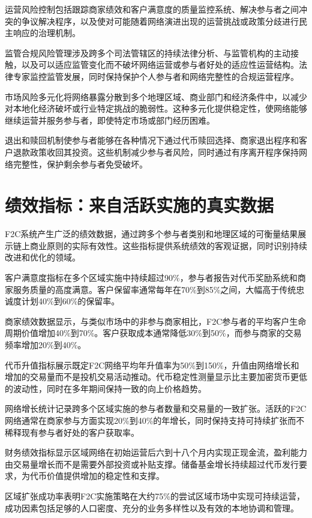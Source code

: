 \documentclass[
  Letterpaper,
]{scrbook}
\begin{document}
运营风险控制包括跟踪商家绩效和客户满意度的质量监控系统、解决参与者之间冲突的争议解决程序，以及使对可能随着网络演进出现的运营挑战或政策分歧进行民主响应的治理机制。

监管合规风险管理涉及跨多个司法管辖区的持续法律分析、与监管机构的主动接触，以及可以适应监管变化而不破坏网络运营或参与者好处的适应性运营结构。法律专家监控监管发展，同时保持保护个人参与者和网络完整性的合规运营程序。

市场风险多元化将网络暴露分散到多个地理区域、商业部门和经济条件中，以减少对本地化经济破坏或行业特定挑战的脆弱性。这种多元化提供稳定性，使网络能够继续运营并服务参与者，即使特定市场或部门经历困难。

退出和赎回机制使参与者能够在各种情况下通过代币赎回选择、商家退出程序和客户退款政策收回其投资。这些机制减少参与者风险，同时通过有序离开程序保持网络完整性，保护剩余参与者免受破坏。

\section{绩效指标：来自活跃实施的真实数据}\label{ux7ee9ux6548ux6307ux6807ux6765ux81eaux6d3bux8dc3ux5b9eux65bdux7684ux771fux5b9eux6570ux636e}

F2C系统产生广泛的绩效数据，通过跨多个参与者类别和地理区域的可衡量结果展示链上商业原则的实际有效性。这些指标提供系统绩效的客观证据，同时识别持续改进和优化的领域。

客户满意度指标在多个区域实施中持续超过90\%，参与者报告对代币奖励系统和商家服务质量的高度满意。客户保留率通常每年在70\%到85\%之间，大幅高于传统忠诚度计划40\%到60\%的保留率。

商家绩效数据显示，与类似市场中的非参与商家相比，F2C参与者的平均客户生命周期价值增加40\%到70\%。客户获取成本通常降低30\%到50\%，而参与商家的交易频率增加20\%到40\%。

代币升值指标展示既定F2C网络平均年升值率为50\%到150\%，升值由网络增长和增加的交易量而不是投机交易活动推动。代币稳定性测量显示比主要加密货币更低的波动性，同时在多年期间保持一致的向上价格趋势。

网络增长统计记录跨多个区域实施的参与者数量和交易量的一致扩张。活跃的F2C网络通常在商家参与方面实现20\%到40\%的年增长，同时保持支持可持续扩张而不稀释现有参与者好处的客户获取率。

财务绩效指标显示区域网络在初始运营后六到十八个月内实现正现金流，盈利能力由交易量增长而不是需要外部投资或补贴支撑。储备基金增长持续超过代币发行要求，为代币价值提供增加的稳定性和支撑。

区域扩张成功率表明F2C实施策略在大约75\%的尝试区域市场中实现可持续运营，成功因素包括足够的人口密度、充分的业务多样性以及有效的本地协调和管理。
\end{document}
